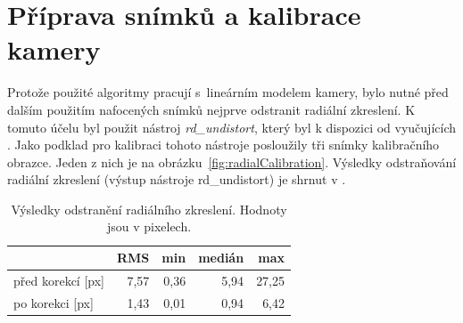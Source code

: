 \documentclass[11pt,oneside,a4paper,pdftex]{article}   %
\begin{document}

\section{Příprava snímků a kalibrace kamery}

	Protože použité algoritmy pra\-cují s~lineárním modelem kamery, bylo nutné před dalším použitím
	nafocených snímků nej\-prve odstranit radiální zkreslení. K tomuto účelu byl použit nástroj
	\emph{rd\_undistort}, který byl k dispozici od vyučujících \cite{code_repo}.  Jako podklad pro
	kalibraci tohoto nástroje posloužily tři snímky kalibračního obrazce. Jeden z nich je na
	obrázku~\ref{fig:radialCalibration}. Výsledky odstraňování radiální zkreslení (výstup nástroje
	rd\_undistort) je shrnut v .

		\begin{table}[h]
			\centering
			\begin{tabular}{|l|rrrr|}
				\hline
									& RMS	& min	& medián	& max	\\
				\hline
				před korekcí [px]	& 7,57	& 0,36	& 5,94		& 27,25		\\
				po korekci [px]		& 1,43	& 0,01	& 0,94		& 6,42		\\
				\hline
			\end{tabular}
			\caption{Výsledky odstranění radiálního zkreslení. Hodnoty jsou v pixelech.}
			\label{tab:rd_undistort}
		\end{table}
	
	\def\IAC{\boldsymbol \omega}
	
\end{document}
